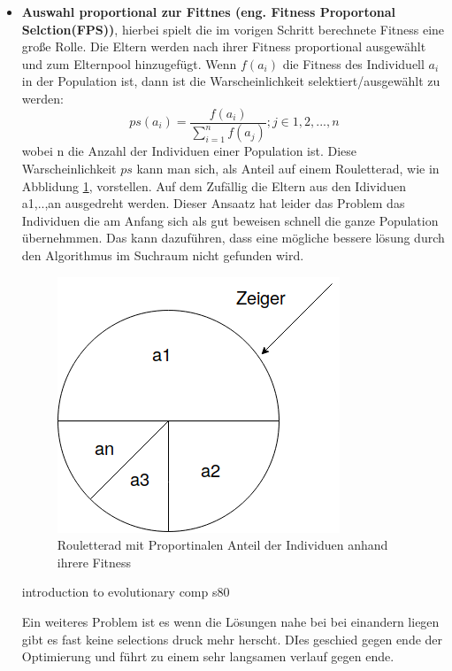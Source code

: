\begin{itemize}
\item \textbf{Auswahl proportional zur Fittnes (eng. Fitness Proportonal Selction(FPS))}, hierbei spielt die im vorigen Schritt berechnete Fitness eine große Rolle. Die Eltern werden nach ihrer Fitness proportional ausgewählt und zum Elternpool hinzugefügt. Wenn $f(a_i)$ die Fitness des Individuell $a_i$ in der Population ist, dann ist die Warscheinlichkeit selektiert/ausgewählt zu werden:
\begin{equation}
	ps(a_i) = \frac{f(a_i)}{\sum_{i=1}^n f(a_j)}; j\in{1,2,...,n} \label{eq:1}
\end{equation}
wobei n die Anzahl der Individuen einer Population ist.
Diese Warscheinlichkeit $ps$ kann man sich, als Anteil auf einem Rouletterad, wie in Abblidung \ref{fig:roulette_wheel}, vorstellen. Auf dem Zufällig die Eltern aus den Idividuen a1,..,an \glqq ausgedreht \grqq werden. Dieser Ansaatz hat leider das Problem das Individuen die am Anfang sich als gut beweisen schnell die ganze Population übernehmmen. Das kann dazuführen, dass eine mögliche bessere lösung durch den Algorithmus im Suchraum nicht gefunden wird.

\begin{figure}[htb]
  \centering  
  \includegraphics[scale=0.5]{img/roulette_wheel.png}
  \caption{Rouletterad mit Proportinalen Anteil der Individuen anhand ihrere Fitness}
  \label{fig:roulette_wheel}
\end{figure}

introduction to evolutionary comp s80

\iffalse
Ein weiteres Problem ist es wenn die Lösungen nahe bei bei einandern liegen gibt es fast keine selections druck mehr herscht. DIes geschied gegen ende der Optimierung und führt zu einem sehr langsamen verlauf gegen ende. 


\end{itemize}
